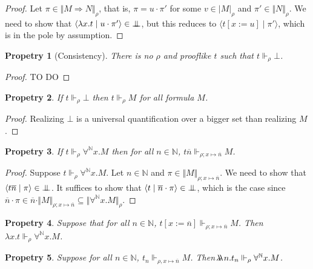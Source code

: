 \documentclass{article}
\newcommand{\N}{\mathbb{N}}
\newcommand{\proc}[2]{\langle{#1}\mid{#2}\rangle}
\newcommand{\depforall}[1]{\forall^\N #1.}
\newcommand{\pole}{{\bot\mkern-10mu\bot}}
\newcommand{\realizes}{\Vdash}
\newcommand{\oracle}[2]{\lambda\mkern-15mu\lambda\ #1. #2}
\newcommand{\terminterp}[2]{\Vert #1 \Vert_{#2}}
\newcommand{\truthinterp}[2]{\vert #1 \vert_{#2}}
\newtheorem{property}{Propetry}
\begin{document}
\begin{proof}
    Let $\pi \in \terminterp{M \Rightarrow N}{\rho}$, that is, $\pi = u \cdot \pi'$ for some $v \in \truthinterp{M}{\rho}$ and $\pi' \in \terminterp{N}{\rho}$.
    We need to show that $\proc{\lambda x. t}{u \cdot \pi'} \in \pole$, but this reduces to $\proc{t[x := u]}{\pi'}$, which is in the pole by assumption.
\end{proof}

\begin{property}[Consistency]
    There is no $\rho$ and prooflike $t$ such that $t \realizes_\rho \bot$.
\end{property}

\begin{proof}
    TO DO
\end{proof}

\begin{property}\label{reabot}
    If $t \realizes_\rho \bot$ then $t \realizes_\rho M$ for all formula $M$.
\end{property}

\begin{proof}
    Realizing $\bot$ is a universal quantification over a bigger set than realizing $M$.
\end{proof}

\begin{property}\label{depforallelim}
    If $t \realizes_\rho \depforall{x} M$ then for all $n \in \N$, $t \overline{n} \realizes_{\rho; x \mapsto \overline{n}} M$.
\end{property}

\begin{proof}
    Suppose $t \realizes_\rho \depforall{x} M$.
    Let $n \in \N$ and $\pi \in \terminterp{M}{\rho; x \mapsto \overline{n}}$.
    We need to show that $\proc{t \overline{n}}{\pi} \in \pole$.
    It suffices to show that $\proc{t}{\overline{n}\cdot\pi} \in \pole$, which is the case since $\overline{n} \cdot \pi \in \overline{n} \cdot \terminterp{M}{\rho; x \mapsto \overline{n}} \subseteq \terminterp{\depforall{x} M}{\rho}$.
\end{proof}

\begin{property}\label{depforallintro}
    Suppose that for all $n \in \N$, $t[x := \overline{n}] \realizes_{\rho; x \mapsto \overline{n}} M$.
    Then $\lambda x. t \realizes_\rho \depforall{x} M$.
\end{property}

\begin{property}\label{depforallintrooracle}
    Suppose for all $n \in \N$, $t_n \realizes_{\rho, x \mapsto \overline{n}} M$.
    Then $\oracle{n}{t_n} \realizes_\rho \depforall{x} M$.
\end{property}
\end{document}
